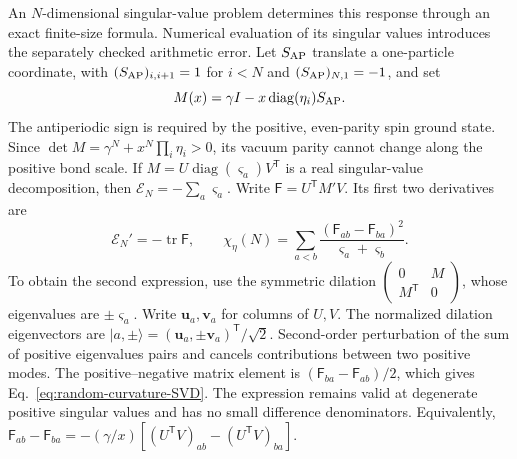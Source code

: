 \documentclass[aps,pre,reprint,amsmath,amssymb,longbibliography,floatfix]{revtex4-2}
\begin{document}
An $N$-dimensional singular-value problem determines this response  through an exact finite-size formula. Numerical evaluation of its
singular values introduces the separately checked arithmetic error. Let $S_{\rm AP}$ translate a one-particle coordinate, with
$(S_{\rm AP})_{i,i+1}=1$ for $i<N$ and
$(S_{\rm AP})_{N,1}=-1$, and set
\begin{equation}
 M(x)=\gamma I-x\operatorname{diag}(\eta_i)S_{\rm AP}.
 \label{eq:random-Majorana-matrix}
\end{equation}
The antiperiodic sign is required by the positive, even-parity spin
ground state. Since
$\det M=\gamma^N+x^N\prod_i\eta_i>0$, its vacuum parity cannot change
along the positive bond scale. If $M=U\operatorname{diag}(\varsigma_a)V^{\mathsf T}$
is a real singular-value decomposition, then
$\mathscr E_N=-\sum_a\varsigma_a$. Write
$\mathsf F=U^{\mathsf T}M'V$. Its first two derivatives are
\begin{equation}
 \mathscr E_N'=-\operatorname{tr}\mathsf F,\qquad
 \chi_\eta(N)=\sum_{a<b}
 \frac{(\mathsf F_{ab}-\mathsf F_{ba})^2}{\varsigma_a+\varsigma_b}.
 \label{eq:random-curvature-SVD}
\end{equation}
To obtain the second expression, use the symmetric dilation
$\left(\begin{smallmatrix}0&M\\M^{\mathsf T}&0\end{smallmatrix}\right)$,
whose eigenvalues are $\pm\varsigma_a$. Write $\boldsymbol u_a,\boldsymbol v_a$ for columns of $U,V$.
The normalized dilation eigenvectors are
$|a,\pm\rangle=(\boldsymbol u_a,\pm\boldsymbol v_a)^{\mathsf T}/\sqrt2$.
Second-order perturbation of the sum of positive eigenvalues pairs
and cancels contributions between two positive modes. The positive--negative matrix element is
$(\mathsf F_{ba}-\mathsf F_{ab})/2$, which gives
Eq.~\eqref{eq:random-curvature-SVD}. The expression remains valid at
degenerate positive singular values and has no small difference
denominators. Equivalently,
$\mathsf F_{ab}-\mathsf F_{ba}=-(\gamma/x)\left[(U^{\mathsf T}V)_{ab}-(U^{\mathsf T}V)_{ba}\right]$.
\end{document}
